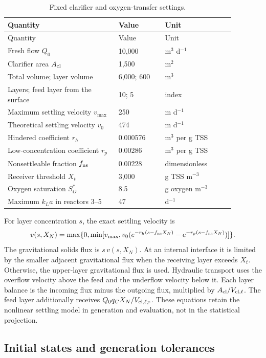 \documentclass[a4paper,fleqn]{cas-sc}
\begin{document}
\begin{longtable}{p{0.43\linewidth}p{0.18\linewidth}p{0.27\linewidth}}
\caption{Fixed clarifier and oxygen-transfer settings.}\label{tab:Ssettling}\\
\toprule
Quantity & Value & Unit\\
\midrule
\endfirsthead
\toprule
Quantity & Value & Unit\\
\midrule
\endhead
Fresh flow $Q_0$ & 10,000 & m$^3$ d$^{-1}$\\
Clarifier area $A_{\rm cl}$ & 1,500 & m$^2$\\
Total volume; layer volume & 6,000; 600 & m$^3$\\
Layers; feed layer from the surface & 10; 5 & index\\
Maximum settling velocity $v_{\max}$ & 250 & m d$^{-1}$\\
Theoretical settling velocity $v_0$ & 474 & m d$^{-1}$\\
Hindered coefficient $r_h$ & 0.000576 & m$^3$ per g TSS\\
Low-concentration coefficient $r_p$ & 0.00286 & m$^3$ per g TSS\\
Nonsettleable fraction $f_{\rm ns}$ & 0.00228 & dimensionless\\
Receiver threshold $X_t$ & 3,000 & g TSS m$^{-3}$\\
Oxygen saturation $S_O^*$ & 8.5 & g oxygen m$^{-3}$\\
Maximum $k_La$ in reactors 3--5 & 47 & d$^{-1}$\\
\bottomrule
\end{longtable}

For layer concentration $s$, the exact settling velocity is
\begin{equation}
v(s,X_N)=\max\{0,\min[v_{\max},v_0(e^{-r_h(s-f_{\rm ns}X_N)}-e^{-r_p(s-f_{\rm ns}X_N)})]\}.
\end{equation}
The gravitational solids flux is $s\,v(s,X_N)$. At an internal interface it is limited by the smaller adjacent gravitational flux when the receiving layer exceeds $X_t$. Otherwise, the upper-layer gravitational flux is used. Hydraulic transport uses the overflow velocity above the feed and the underflow velocity below it. Each layer balance is the incoming flux minus the outgoing flux, multiplied by $A_{\rm cl}/V_{{\rm cl},\ell}$. The feed layer additionally receives $Q_0q_CX_N/V_{{\rm cl},\ell_F}$. These equations retain the nonlinear settling model in generation and evaluation, not in the statistical projection.

\subsection{Initial states and generation tolerances}
\label{sec:Sgeneration}
\end{document}
